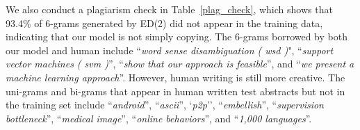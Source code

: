 \documentclass[11pt,a4paper]{article}
\begin{document}
We also conduct a plagiarism check in Table~\ref{plag_check}, which shows that 93.4\% of 6-grams generated by  ED(2) did not appear in the training data, indicating that our model is not simply copying. The 6-grams borrowed by both our model and human include ``\textit{word sense disambiguation ( wsd )}", ``\textit{support vector machines ( svm )}'', 
``\textit{show that our approach is feasible}'', and ``\textit{we present a machine learning approach}''. 
However, human writing is still more creative. 
The uni-grams and bi-grams that appear in human written test abstracts but not in the training set include ``\textit{android}'', ``\textit{ascii}'', `\textit{p2p}'', ``\textit{embellish}'', ``\textit{supervision bottleneck}'', ``\textit{medical image}'', ``\textit{online behaviors}'', and ``\textit{1,000 languages}''.
\end{document}
